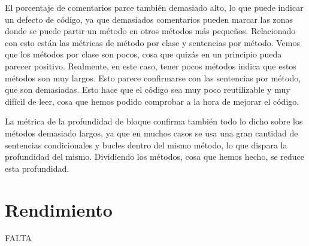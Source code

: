 El porcentaje de comentarios parce también demasiado alto, lo que puede indicar un defecto de código, ya que demasiados comentarios pueden marcar las zonas donde se puede partir un método en otros métodos más pequeños. Relacionado con esto están las métricas de método por clase y sentencias por método. Vemos que los métodos por clase son pocos, cosa que quizás en un principio pueda parecer positivo. Realmente, en este caso, tener pocos métodos indica que estos métodos son muy largos. Esto parece confirmarse con las sentencias por método, que son demasiadas. Esto hace que el código sea muy poco reutilizable y muy difícil de leer, cosa que hemos podido comprobar a la hora de mejorar el código.

La métrica de la profundidad de bloque confirma también todo lo dicho sobre los métodos demasiado largos, ya que en muchos casos se usa una gran cantidad de sentencias condicionales y bucles dentro del mismo método, lo que dispara la profundidad del mismo. Dividiendo los métodos, cosa que hemos hecho, se reduce esta profundidad.


\section{Rendimiento}\label{rendimiento}
FALTA